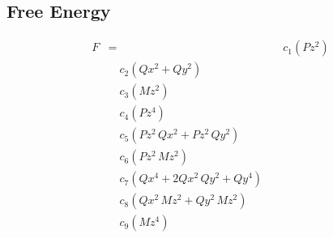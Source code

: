 \documentclass{article}
\begin{document}
\subsection*{Free Energy}

\begin{align*}
F &=
  &\quad c_{1} \left(Pz^{2}\right) \\
  &\quad c_{2} \left(Qx^{2} + Qy^{2}\right) \\
  &\quad c_{3} \left(Mz^{2}\right) \\
  &\quad c_{4} \left(Pz^{4}\right) \\
  &\quad c_{5} \left(Pz^{2}\,Qx^{2} + Pz^{2}\,Qy^{2}\right) \\
  &\quad c_{6} \left(Pz^{2}\,Mz^{2}\right) \\
  &\quad c_{7} \left(Qx^{4} + 2Qx^{2}\,Qy^{2} + Qy^{4}\right) \\
  &\quad c_{8} \left(Qx^{2}\,Mz^{2} + Qy^{2}\,Mz^{2}\right) \\
  &\quad c_{9} \left(Mz^{4}\right)
\end{align*}
\end{document}
